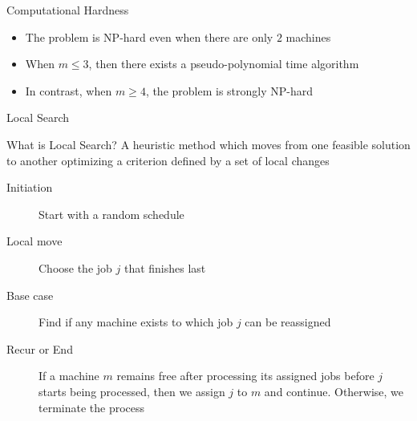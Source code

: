 \documentclass[aspectratio=169,xcolor=dvipsnames, t]{beamer}
\begin{document}
\begin{frame}{Computational Hardness}
    \begin{itemize}
        \item The problem is NP-hard even when there are only $2$ machines \pause
        \item When $m \le 3$, then there exists a pseudo-polynomial time algorithm \pause
        \item In contrast, when $m \ge 4$, the problem is strongly NP-hard
    \end{itemize}
\end{frame}


\begin{frame}{Local Search}
    \begin{block}{What is Local Search?}
        A heuristic method which moves from one feasible solution to another optimizing a criterion defined by a set of local changes
    \end{block} \pause

    \begin{description}
        \item[Initiation] Start with a random schedule \pause
        \item[Local move] Choose the job $j$ that finishes last \pause
        \item[Base case] Find if any machine exists to which job $j$ can be reassigned \pause
        \item[Recur or End] If a machine $m$ remains free after processing its assigned jobs before $j$ starts being processed, then we assign $j$ to $m$ and continue. Otherwise, we terminate the process
    \end{description}
\end{frame}
\end{document}
